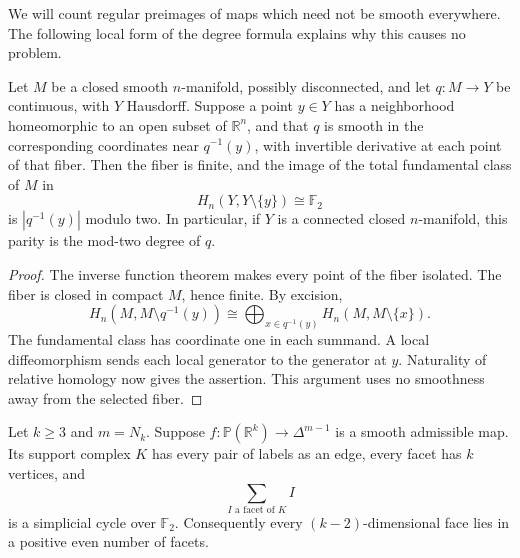 We will count regular preimages of maps which need not be smooth
everywhere.  The following local form of the degree formula explains
why this causes no problem.

\begin{lemma}\label{lem:local-degree}
Let $M$ be a closed smooth $n$-manifold, possibly disconnected, and
let $q:M\to Y$ be continuous, with $Y$ Hausdorff.  Suppose a point $y\in Y$ has a
neighborhood homeomorphic to an open subset of $\mathbb R^n$, and
that $q$ is smooth in the corresponding coordinates near
$q^{-1}(y)$, with invertible derivative at each point of that fiber.
Then the fiber is finite, and the image of the total fundamental
class of $M$ in
\[
 H_n(Y,Y\setminus\{y\})\cong\mathbb F_2
\]
is $|q^{-1}(y)|$ modulo two.  In particular, if $Y$ is a connected
closed $n$-manifold, this parity is the mod-two degree of $q$.
\end{lemma}

\begin{proof}
The inverse function theorem makes every point of the fiber
isolated.  The fiber is closed in compact $M$, hence finite.
By excision,
\[
 H_n(M,M\setminus q^{-1}(y))
 \cong\bigoplus_{x\in q^{-1}(y)}H_n(M,M\setminus\{x\}).
\]
The fundamental class has coordinate one in each summand.  A local
diffeomorphism sends each local generator to the generator at $y$.
Naturality of relative homology now gives the assertion.  This
argument uses no smoothness away from the selected fiber.
\end{proof}

\begin{theorem}\label{thm:equality-complex}
Let $k\ge3$ and $m=N_k$.  Suppose
$f:\mathbb P(\mathbb R^k)\to\Delta^{m-1}$ is a smooth admissible map.
Its support complex $K$ has every pair of labels as an edge, every
facet has $k$ vertices, and
\[
 \sum_{I\text{ a facet of }K} I
\]
is a simplicial cycle over $\mathbb F_2$.  Consequently every
$(k-2)$-dimensional face lies in a positive even number of facets.
\end{theorem}

